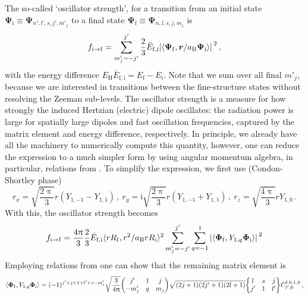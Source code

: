 \documentclass[fontsize=12pt,
               twoside=false,
               BCOR=0mm,
               DIV=14,
               overfullrule=true, %
               toc=bibliography,
               headinclude=true,
               footinclude=false]{scrartcl}
\numberwithin{equation}{section}
\newcommand{\ii}{\mathrm{i}}
\newcommand{\pii}{\uppi}
\newcommand{\aB}{a_\mathrm{B}}
\newcommand{\EH}{E_\mathrm{H}}
\begin{document}
    The so-called `oscillator strength', for a transition from an initial state
    $\bm{\Psi}_\mathrm{i}\equiv\bm{\Psi}_{n',l',s,j',m'_j}$ to a final state
    $\bm{\Psi}_\mathrm{f}\equiv\bm{\Psi}_{n,l,s,j,m_j}$ is
    \cite{friedrich2017}
    \begin{equation}
        f_{\mathrm{i}\to\mathrm{f}}
        =
        \sum^{j'}_{m'_j=-j'}
        \frac{2}{3} \bar{E}_\mathrm{f,i}
        \abs*{\langle\bm{\Psi}_\mathrm{f},
                     \bm{r}\slash\aB\bm{\Psi}_\mathrm{i}\rangle}^2
    \,,
    \end{equation}
    with the energy difference
    $\EH\bar{E}_\mathrm{f,i}=E_\mathrm{f}-E_\mathrm{i}$. Note that we sum over
    all final $m'_j$, because we are interested in transitions between the
    fine-structure states without resolving the Zeeman sub-levels. The oscillator
    strength is a measure for how strongly the induced Hertzian (electric)
    dipole oscillates: the radiation power is large for spatially large dipoles
    and fast oscillation frequencies, captured by the matrix element and energy
    difference, respectively. In principle, we already have all the machinery
    to numerically compute this quantity, however, one can reduce the expression
    to a much simpler form by using angular momentum algebra, in particular,
    relations from \cite{varshalovic1988}. To simplify the expression, we first
    use (Condon-Shortley phase)
    \begin{equation}
        r_x
        =
        \sqrt{\frac{2\pii}{3}} r (Y_{1,-1}-Y_{1,1})
    \,, \
        r_y
        =
        \ii \sqrt{\frac{2\pii}{3}} r (Y_{1,-1}+Y_{1,1})
    \,, \
        r_z
        =
        \sqrt{\frac{4\pii}{3}} r Y_{1,0}
    \,.
    \end{equation}
    With this, the oscillator strength becomes
    \begin{equation}
        f_{\mathrm{i}\to\mathrm{f}}
        =
        \frac{4\pii}{3} \frac{2}{3} \bar{E}_\mathrm{f,i}
        \langle{r}R_\mathrm{f},r^2\slash\aB{r}R_\mathrm{i}\rangle^2
        \sum^{j'}_{m'_j=-j'}
        \sum^1_{q=-1}
        \abs*{\langle\bm{\Phi}_\mathrm{f},Y_{1,q}\bm{\Phi}_\mathrm{i}\rangle}^2
    \end{equation}
    Employing relations from \cite[p.~236,244,260,445,496]{varshalovic1988} one
    can show that the remaining matrix element is
    \begin{equation}
        \langle \bm{\Phi}_\mathrm{f}, Y_{1,q}\bm{\Phi}_\mathrm{i} \rangle
        =
        (-1)^{j'+j+1+l'+s-m'_j}
        \sqrt{\frac{3}{4\pii}}
        \mqty(j' & 1 & j \\ -m'_j & q & m_j)
        \sqrt{(2j+1)(2j'+1)(2l+1)}
        \bigg\{\mqty{l & s & j \\ j' & 1 & l'}\bigg\}
        C^{l,0,1,0}_{l',0}
    \,,
    \end{equation}
\end{document}
